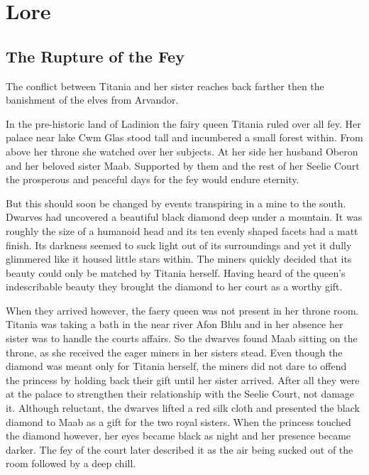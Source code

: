 \documentclass[letter,10pt,twocolumn,openany]{dndbook}
\begin{document}
\chapter{Lore}

\section{The Rupture of the Fey}

The conflict between Titania and her sister reaches back farther then the banishment of the elves from Arvandor.

In the pre-historic land of Ladinion the fairy queen Titania ruled over all fey.
Her palace near lake Cwm Glas stood tall and incumbered a small forest within.
From above her throne she watched over her subjects.
At her side her husband Oberon and her beloved sister Maab.
Supported by them and the rest of her Seelie Court the prosperous and peaceful days for the fey would endure eternity.

But this should soon be changed by events transpiring in a mine to the south.
Dwarves had uncovered a beautiful black diamond deep under a mountain.
It was roughly the size of a humanoid head and its ten evenly shaped facets had a matt finish.
Its darkness seemed to suck light out of its surroundings and yet it dully glimmered like it housed little stars within.
The miners quickly decided that its beauty could only be matched by Titania herself.
Having heard of the queen's indescribable beauty they brought the diamond to her court as a worthy gift.

When they arrived however, the faery queen was not present in her throne room.
Titania was taking a bath in the near river Afon Bhlu and in her absence her sister was to handle the courts affairs.
So the dwarves found Maab sitting on the throne, as she received the eager miners in her sisters stead.
Even though the diamond was meant only for Titania herself, the miners did not dare to offend the princess by holding back their gift until her sister arrived.
After all they were at the palace to strengthen their relationship with the Seelie Court, not damage it.
Although reluctant, the dwarves lifted a red silk cloth and presented the black diamond to Maab as a gift for the two royal sisters.
When the princess touched the diamond however, her eyes became black as night and her presence became darker.
The fey of the court later described it as the air being sucked out of the room followed by a deep chill.
\end{document}
